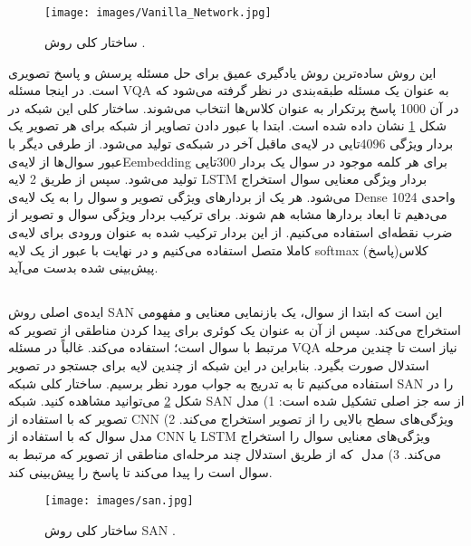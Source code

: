 {	\subsection{ \cite{antol2015vqa}}
	{
		\begin{figure}[h]
			\centering
			\texttt{[image: images/Vanilla\_Network.jpg]}
			\caption{ساختار کلی روش   .}
			\label{fig:3}
		\end{figure}
		این روش ساده‌ترین روش یادگیری عمیق برای حل مسئله پرسش و پاسخ تصویری است. در اینجا مسئله VQA به عنوان یک مسئله طبقه‌بندی در نظر گرفته می‌شود که در آن 1000 پاسخ پرتکرار به عنوان کلاس‌ها انتخاب می‌شوند.  ساختار کلی این شبکه در شکل 
		\ref{fig:3}
		نشان داده شده است. ابتدا با عبور دادن تصاویر از شبکه 
		 برای هر تصویر یک بردار ویژگی 4096تایی در لایه‌ی ماقبل آخر در شبکه‌ی
		   تولید می‌شود. از طرفی دیگر با عبور سوال‌ها از لایه‌یEembedding برای هر کلمه موجود در سوال یک بردار 300تایی تولید می‌شود. سپس از طریق 2 لایه LSTM بردار ویژگی معنایی سوال استخراج  می‌شود. هر یک از بردارهای ویژگی تصویر و سوال را به یک لایه‌ی Dense  1024 واحدی می‌دهیم تا ابعاد بردار‌ها مشابه هم شوند. برای ترکیب بردار ویژگی سوال و تصویر از ضرب نقطه‌ای استفاده می‌کنیم. از این بردار ترکیب شده به عنوان ورودی برای لایه‌ی کاملا متصل استفاده می‌کنیم و در نهایت با عبور از یک لایه softmax کلاس(پاسخ) پیش‌بینی شده بدست می‌آید.
	}

	\subsection{ \cite{yang2016stacked} }
	{
		ایده‌ی اصلی روش SAN‌ این است که ابتدا از سوال، یک  بازنمایی معنایی و مفهومی استخراج می‌کند. سپس از آن به عنوان یک کوئری برای پیدا کردن مناطقی از تصویر که مرتبط با سوال است؛ استفاده می‌کند. غالباً در مسئله VQA نیاز است تا چندین مرحله استدلال صورت بگیرد. بنابراین در این شبکه از چندین لایه برای جستجو در تصویر استفاده می‌کنیم تا به تدریج به جواب مورد نظر برسیم. ساختار کلی شبکه SAN را در شکل 
		\ref{fig:1}
		می‌توانید مشاهده کنید. شبکه SAN از سه جز اصلی تشکیل شده است: 1) مدل تصویر که با استفاده از CNN ویژگی‌های سطح بالایی را از تصویر استخراج می‌کند. 2) مدل سوال که با استفاده از CNN یا LSTM ویژگی‌های معنایی سوال را استخراج می‌کند. 3) مدل
		 ‌ که از طریق استدلال چند مرحله‌ای مناطقی از تصویر که مرتبط به سوال است را پیدا می‌کند تا پاسخ را پیش‌بینی کند.
		\begin{figure}[H]
			\centering
			\texttt{[image: images/san.jpg]}
			\caption{ساختار کلی روش SAN .}
			\label{fig:1}
		\end{figure}
	
}}

